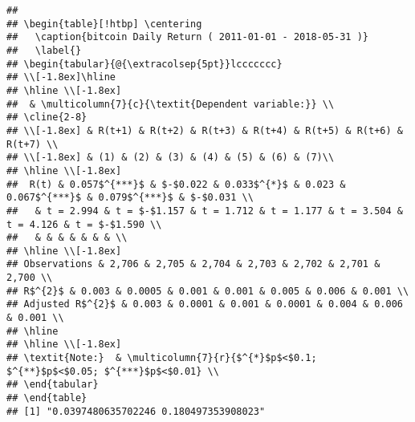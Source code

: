 \documentclass[
]{article}
\newenvironment{Shaded}{\begin{snugshade}}{\end{snugshade}}
\newcommand{\CommentTok}[1]{\textcolor[rgb]{0.56,0.35,0.01}{\textit{#1}}}
\newcommand{\NormalTok}[1]{#1}
\begin{document}
\begin{verbatim}
## 
## \begin{table}[!htbp] \centering 
##   \caption{bitcoin Daily Return ( 2011-01-01 - 2018-05-31 )} 
##   \label{} 
## \begin{tabular}{@{\extracolsep{5pt}}lccccccc} 
## \\[-1.8ex]\hline 
## \hline \\[-1.8ex] 
##  & \multicolumn{7}{c}{\textit{Dependent variable:}} \\ 
## \cline{2-8} 
## \\[-1.8ex] & R(t+1) & R(t+2) & R(t+3) & R(t+4) & R(t+5) & R(t+6) & R(t+7) \\ 
## \\[-1.8ex] & (1) & (2) & (3) & (4) & (5) & (6) & (7)\\ 
## \hline \\[-1.8ex] 
##  R(t) & 0.057$^{***}$ & $-$0.022 & 0.033$^{*}$ & 0.023 & 0.067$^{***}$ & 0.079$^{***}$ & $-$0.031 \\ 
##   & t = 2.994 & t = $-$1.157 & t = 1.712 & t = 1.177 & t = 3.504 & t = 4.126 & t = $-$1.590 \\ 
##   & & & & & & & \\ 
## \hline \\[-1.8ex] 
## Observations & 2,706 & 2,705 & 2,704 & 2,703 & 2,702 & 2,701 & 2,700 \\ 
## R$^{2}$ & 0.003 & 0.0005 & 0.001 & 0.001 & 0.005 & 0.006 & 0.001 \\ 
## Adjusted R$^{2}$ & 0.003 & 0.0001 & 0.001 & 0.0001 & 0.004 & 0.006 & 0.001 \\ 
## \hline 
## \hline \\[-1.8ex] 
## \textit{Note:}  & \multicolumn{7}{r}{$^{*}$p$<$0.1; $^{**}$p$<$0.05; $^{***}$p$<$0.01} \\ 
## \end{tabular} 
## \end{table} 
## [1] "0.0397480635702246 0.180497353908023"
\end{verbatim}

\begin{Shaded}
\end{Shaded}
\end{document}
